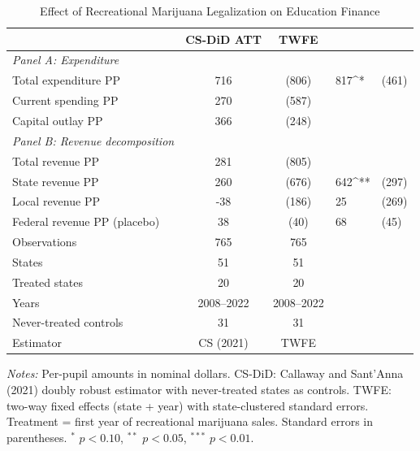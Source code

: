 
\begin{table}[htbp]
\centering
\caption{Effect of Recreational Marijuana Legalization on Education Finance}
\label{tab:main}
\small
\begin{tabular}{lcc}
\hline\hline
 & CS-DiD ATT & TWFE \\
\hline
\textit{Panel A: Expenditure} & & \\[3pt]
Total expenditure PP & 716 & (806) & 817^{*} & (461) \\[6pt]
Current spending PP & 270 & (587) & \\[6pt]
Capital outlay PP & 366 & (248) & \\[12pt]
\textit{Panel B: Revenue decomposition} & & \\[3pt]
Total revenue PP & 281 & (805) & \\[6pt]
State revenue PP & 260 & (676) & 642^{**} & (297) \\[6pt]
Local revenue PP & -38 & (186) & 25 & (269) \\[6pt]
Federal revenue PP (placebo) & 38 & (40) & 68 & (45) \\[6pt]
\hline
Observations & 765 & 765 \\
States & 51 & 51 \\
Treated states & 20 & 20 \\
Years & 2008--2022 & 2008--2022 \\
Never-treated controls & 31 & 31 \\
Estimator & CS (2021) & TWFE \\
\hline\hline
\end{tabular}
\begin{tablenotes}
\small
\item \textit{Notes:} Per-pupil amounts in nominal dollars. CS-DiD: Callaway and Sant'Anna (2021) doubly robust estimator with never-treated states as controls. TWFE: two-way fixed effects (state + year) with state-clustered standard errors. Treatment = first year of recreational marijuana sales. Standard errors in parentheses. $^{*}$ $p<0.10$, $^{**}$ $p<0.05$, $^{***}$ $p<0.01$.
\end{tablenotes}
\end{table}

